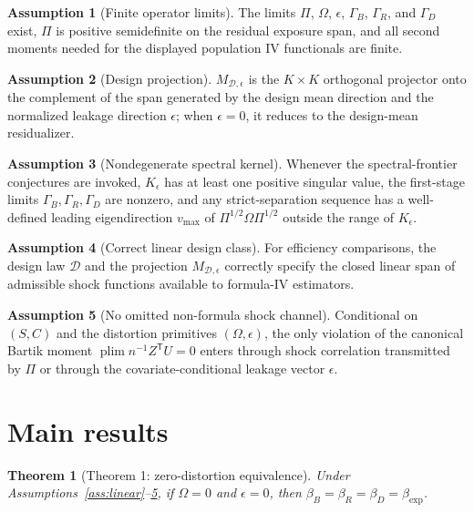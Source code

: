 \documentclass[11pt]{article}
\newcommand{\transpose}{\mathsf{T}}
\newcommand{\plim}{\operatorname*{plim}}
\theoremstyle{definition}
\newtheorem{assumption}{Assumption}
\theoremstyle{plain}
\newtheorem{theorem}{Theorem}
\theoremstyle{remark}
\begin{document}
\begin{assumption}[Finite operator limits]\label{ass:limits}
The limits $\Pi$, $\Omega$, $\epsilon$, $\Gamma_B$, $\Gamma_R$, and $\Gamma_D$ exist, $\Pi$ is positive semidefinite on the residual exposure span, and all second moments needed for the displayed population IV functionals are finite.
\end{assumption}

\begin{assumption}[Design projection]\label{ass:projection}
$M_{\mathcal{D},\epsilon}$ is the $K\times K$ orthogonal projector onto the complement of the span generated by the design mean direction and the normalized leakage direction $\epsilon$; when $\epsilon=0$, it reduces to the design-mean residualizer.
\end{assumption}

\begin{assumption}[Nondegenerate spectral kernel]\label{ass:nondegenerate}
Whenever the spectral-frontier conjectures are invoked, $K_\epsilon$ has at least one positive singular value, the first-stage limits $\Gamma_B,\Gamma_R,\Gamma_D$ are nonzero, and any strict-separation sequence has a well-defined leading eigendirection $v_{\max}$ of $\Pi^{1/2}\Omega\Pi^{1/2}$ outside the range of $K_\epsilon$.
\end{assumption}

\begin{assumption}[Correct linear design class]\label{ass:efficient-class}
For efficiency comparisons, the design law $\mathcal{D}$ and the projection $M_{\mathcal{D},\epsilon}$ correctly specify the closed linear span of admissible shock functions available to formula-IV estimators.
\end{assumption}

\begin{assumption}[No omitted non-formula shock channel]\label{ass:no-omitted}
Conditional on $(S,C)$ and the distortion primitives $(\Omega,\epsilon)$, the only violation of the canonical Bartik moment $\plim n^{-1}Z^\transpose U=0$ enters through shock correlation transmitted by $\Pi$ or through the covariate-conditional leakage vector $\epsilon$.
\end{assumption}

\section{Main results}
\begin{theorem}[Theorem 1: zero-distortion equivalence]\label{thm:zero-distortion}
Under Assumptions~\ref{ass:linear}--\ref{ass:no-omitted}, if $\Omega=0$ and $\epsilon=0$, then $\beta_B=\beta_R=\beta_D=\beta_{\exp}$.
\end{theorem}
\end{document}
